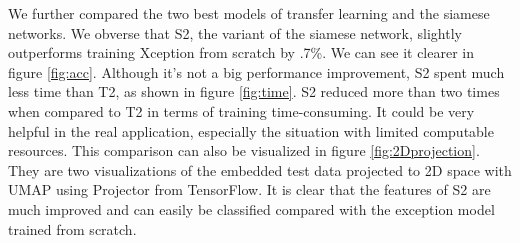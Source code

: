 We further compared the two best models of transfer learning and the siamese networks. We obverse that S2, the variant of the siamese network, slightly outperforms training Xception from scratch by .7\%. We can see it clearer in figure \ref{fig:acc}. Although it's not a big performance improvement, S2 spent much less time than T2, as shown in figure \ref{fig:time}. S2 reduced more than two times when compared to T2 in terms of training time-consuming. It could be very helpful in the real application, especially the situation with limited computable resources. This comparison can also be visualized in figure \ref{fig:2Dprojection}. They are two visualizations of the embedded test data projected to 2D space with UMAP using Projector from TensorFlow.  It is clear that the features of S2 are much improved and can easily be classified compared with the exception model trained from scratch. 

